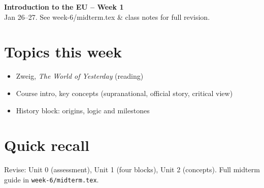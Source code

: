 \documentclass[10pt,a4paper]{article}
\begin{document}
\begin{center}
{\large\bfseries\color{eublue} Introduction to the EU -- Week 1}\\[0.2em]
\footnotesize Jan 26--27. See week-6/midterm.tex \& class notes for full revision.
\end{center}\vspace{0.5em}

\section*{\color{eublue}Topics this week}
\begin{itemize}
\item Zweig, \textit{The World of Yesterday} (reading)
\item Course intro, key concepts (supranational, official story, critical view)
\item History block: origins, logic and milestones
\end{itemize}

\section*{Quick recall}
Revise: Unit 0 (assessment), Unit 1 (four blocks), Unit 2 (concepts). Full midterm guide in \texttt{week-6/midterm.tex}.
\end{document}
